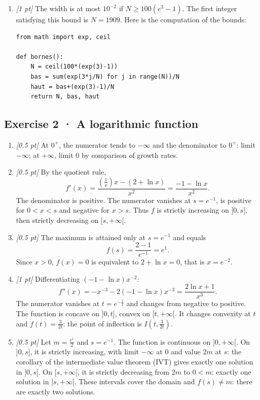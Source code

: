 \begin{enumerate}

\item \textit{[1 pt]} The width is at most $10^{-2}$ if $N\ge100(e^{3}-1)$. The first integer satisfying this bound is $N=1909$. Here is the computation of the bounds:
\begin{lstlisting}
from math import exp, ceil

def bornes():
    N = ceil(100*(exp(3)-1))
    bas = sum(exp(3*j/N) for j in range(N))/N
    haut = bas+(exp(3)-1)/N
    return N, bas, haut
\end{lstlisting}


\end{enumerate}

\subsection*{Exercise 2 · A logarithmic function}\begin{enumerate}

\item \textit{[0.5 pt]} At $0^+$, the numerator tends to $-\infty$ and the denominator to $0^+$: limit $-\infty$; at $+\infty$, limit $0$ by comparison of growth rates.

\item \textit{[0.5 pt]} By the quotient rule,
\[f'(x)=\frac{(\frac{1}{x})x-(2+\ln x)}{x^2}=\frac{-1-\ln x}{x^2}.\]
The denominator is positive. The numerator vanishes at $s=e^{-1}$, is positive for $0<x<s$ and negative for $x>s$. Thus $f$ is strictly increasing on $]0,s]$, then strictly decreasing on $[s,+\infty[$.

\item \textit{[0.5 pt]} The maximum is attained only at $s=e^{-1}$ and equals
\[f(s)=\frac{2- 1}{e^{-1}}=e^{1}.\]
Since $x>0$, $f(x)=0$ is equivalent to $2+\ln x=0$, that is $x=e^{-2}$.

\item \textit{[1 pt]} Differentiating $(-1-\ln x)x^{-2}$:
\[f''(x)=-x^{-3}-2(-1-\ln x)x^{-3}=\frac{2\ln x+1}{x^3}.\]
The numerator vanishes at $t=e^{-\frac{1}{2}}$ and changes from negative to positive. The function is concave on $]0,t]$, convex on $[t,+\infty[$. It changes convexity at $t$ and $f(t)=\frac{3}{2t}$: the point of inflection is $I(t,\frac{3}{2t})$.

\item \textit{[0.5 pt]} Let $m=\frac{e^{1}}{2}$ and $s=e^{-1}$. The function is continuous on $]0,+\infty[$. On $]0,s]$, it is strictly increasing, with limit $-\infty$ at $0$ and value $2m$ at $s$: the corollary of the intermediate value theorem (IVT) gives exactly one solution in $]0,s[$. On $[s,+\infty[$, it is strictly decreasing from $2m$ to $0<m$: exactly one solution in $]s,+\infty[$. These intervals cover the domain and $f(s)\ne m$: there are exactly two solutions.


\end{enumerate}
